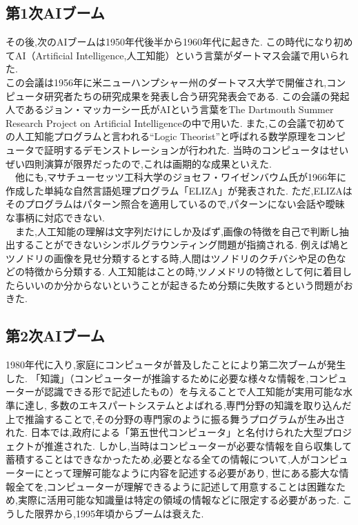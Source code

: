 \subsection{第1次AIブーム}
その後,次のAIブームは1950年代後半から1960年代に起きた.
この時代になり初めてAI（Artificial Intelligence,人工知能）という言葉がダートマス会議で用いられた.\\
この会議は1956年に米ニューハンプシャー州のダートマス大学で開催され,コンピュータ研究者たちの研究成果を発表し合う研究発表会である.\cite{webpage4}
この会議の発起人であるジョン・マッカーシー氏がAIという言葉をThe Dartmouth Summer Research Project on Artificial Intelligence\cite{ronbun2}の中で用いた.
また,この会議で初めての人工知能プログラムと言われる“Logic Theorist”と呼ばれる数学原理をコンピュータで証明するデモンストレーションが行われた.
当時のコンピュータはせいぜい四則演算が限界だったので,これは画期的な成果といえた.\\
　他にも,マサチューセッツ工科大学のジョセフ・ワイゼンバウム氏が1966年に作成した単純な自然言語処理プログラム「ELIZA」が発表された.
ただ,ELIZAはそのプログラムはパターン照合を適用しているので,パターンにない会話や曖昧な事柄に対応できない.\\
　また,人工知能の理解は文字列だけにしか及ばず,画像の特徴を自己で判断し抽出することができないシンボルグラウンティング問題が指摘される.
例えば鳩とツノドリの画像を見せ分類するとする時,人間はツノドリのクチバシや足の色などの特徴から分類する.
人工知能はことの時,ツノメドリの特徴として何に着目したらいいのか分からないということが起きるため分類に失敗するという問題がおきた.
\subsection{第2次AIブーム}
1980年代に入り,家庭にコンピュータが普及したことにより第二次ブームが発生した.
「知識」（コンピューターが推論するために必要な様々な情報を,コンピューターが認識できる形で記述したもの）を与えることで人工知能が実用可能な水準に達し,
多数のエキスパートシステムとよばれる,専門分野の知識を取り込んだ上で推論することで,その分野の専門家のように振る舞うプログラムが生み出された.
日本では,政府による「第五世代コンピュータ」と名付けられた大型プロジェクトが推進された.
しかし,当時はコンピューターが必要な情報を自ら収集して蓄積することはできなかったため,必要となる全ての情報について,人がコンピューターにとって理解可能なように内容を記述する必要があり,
世にある膨大な情報全てを,コンピューターが理解できるように記述して用意することは困難なため,実際に活用可能な知識量は特定の領域の情報などに限定する必要があった.
こうした限界から,1995年頃からブームは衰えた.
